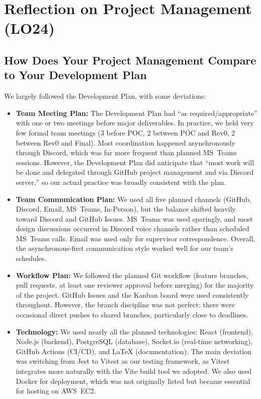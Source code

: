 \documentclass{article}
\begin{document}
\section{Reflection on Project Management (LO24)}

\subsection{How Does Your Project Management Compare to Your Development Plan}

We largely followed the Development Plan, with some deviations:

\begin{itemize}
  \item \textbf{Team Meeting Plan:} The Development Plan had ``as required/appropriate'' with one or two meetings before major deliverables. In practice, we held very few formal team meetings (3 before POC, 2 between POC and Rev0, 2 between Rev0 and Final). Most coordination happened asynchronously through Discord, which was far more frequent than planned MS~Teams sessions. However, the Development Plan did anticipate that ``most work will be done and delegated through GitHub project management and via Discord server,'' so our actual practice was broadly consistent with the plan.

  \item \textbf{Team Communication Plan:} We used all five planned channels (GitHub, Discord, Email, MS~Teams, In-Person), but the balance shifted heavily toward Discord and GitHub Issues. MS~Teams was used sparingly, and most design discussions occurred in Discord voice channels rather than scheduled MS~Teams calls. Email was used only for supervisor correspondence. Overall, the asynchronous-first communication style worked well for our team's schedules.

  \item \textbf{Workflow Plan:} We followed the planned Git workflow (feature branches, pull requests, at least one reviewer approval before merging) for the majority of the project. GitHub Issues and the Kanban board were used consistently throughout. However, the branch discipline was not perfect: there were occasional direct pushes to shared branches, particularly close to deadlines.

  \item \textbf{Technology:} We used nearly all the planned technologies: React (frontend), Node.js (backend), PostgreSQL (database), Socket.io (real-time networking), GitHub Actions (CI/CD), and LaTeX (documentation). The main deviation was switching from Jest to Vitest as our testing framework, as Vitest integrates more naturally with the Vite build tool we adopted. We also used Docker for deployment, which was not originally listed but became essential for hosting on AWS~EC2.
\end{itemize}
\end{document}
